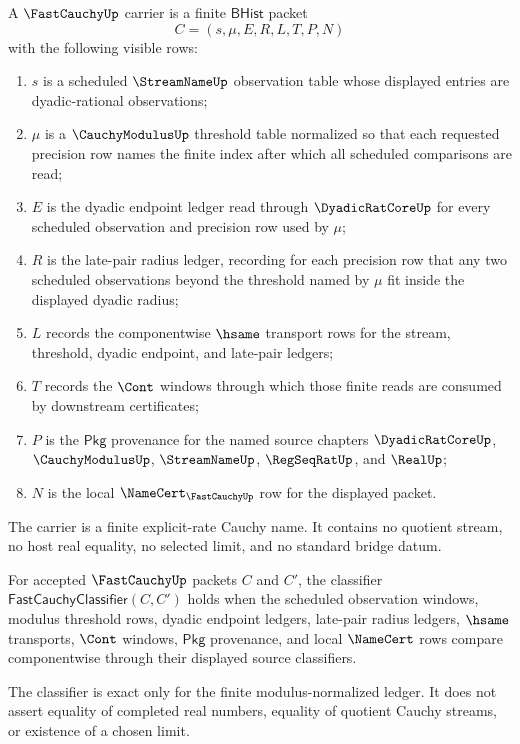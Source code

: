 \begin{definition}
\label{def:fastcauchy-carrier}
A $\FastCauchyUp$ carrier is a finite $\mathsf{BHist}$ packet
$$
C=(s,\mu,E,R,L,T,P,N)
$$
with the following visible rows:
\begin{enumerate}
\item $s$ is a scheduled $\StreamNameUp$ observation table whose displayed entries are dyadic-rational observations;
\item $\mu$ is a $\CauchyModulusUp$ threshold table normalized so that each requested precision row names the finite index after which all scheduled comparisons are read;
\item $E$ is the dyadic endpoint ledger read through $\DyadicRatCoreUp$ for every scheduled observation and precision row used by $\mu$;
\item $R$ is the late-pair radius ledger, recording for each precision row that any two scheduled observations beyond the threshold named by $\mu$ fit inside the displayed dyadic radius;
\item $L$ records the componentwise $\hsame$ transport rows for the stream, threshold, dyadic endpoint, and late-pair ledgers;
\item $T$ records the $\Cont$ windows through which those finite reads are consumed by downstream certificates;
\item $P$ is the $\mathsf{Pkg}$ provenance for the named source chapters $\DyadicRatCoreUp$, $\CauchyModulusUp$, $\StreamNameUp$, $\RegSeqRatUp$, and $\RealUp$;
\item $N$ is the local $\NameCert_{\FastCauchyUp}$ row for the displayed packet.
\end{enumerate}
The carrier is a finite explicit-rate Cauchy name. It contains no quotient stream, no host real equality, no selected limit, and no standard bridge datum.
\end{definition}

\begin{definition}
\label{def:fastcauchy-classifier}
For accepted $\FastCauchyUp$ packets $C$ and $C'$, the classifier $\mathsf{FastCauchyClassifier}(C,C')$ holds when the scheduled observation windows, modulus threshold rows, dyadic endpoint ledgers, late-pair radius ledgers, $\hsame$ transports, $\Cont$ windows, $\mathsf{Pkg}$ provenance, and local $\NameCert$ rows compare componentwise through their displayed source classifiers.

The classifier is exact only for the finite modulus-normalized ledger. It does not assert equality of completed real numbers, equality of quotient Cauchy streams, or existence of a chosen limit.
\end{definition}

